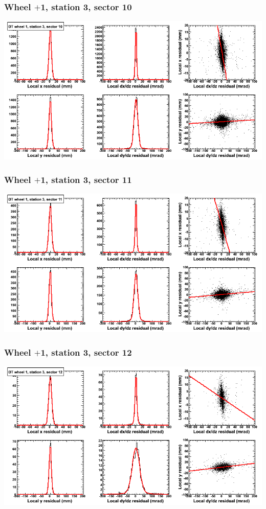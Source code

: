 \documentclass[compress]{beamer}
\begin{document}
\begin{frame}
\frametitle{Wheel $+$1, station 3, sector 10}
\includegraphics[width=\linewidth]{tmpbell_MBwhDst3sec10.png}
\end{frame}

\begin{frame}
\frametitle{Wheel $+$1, station 3, sector 11}
\includegraphics[width=\linewidth]{tmpbell_MBwhDst3sec11.png}
\end{frame}

\begin{frame}
\frametitle{Wheel $+$1, station 3, sector 12}
\includegraphics[width=\linewidth]{tmpbell_MBwhDst3sec12.png}
\end{frame}
\end{document}
